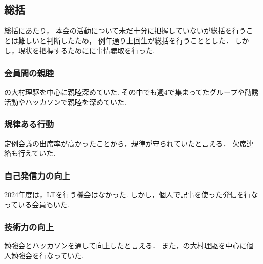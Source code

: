 \subsection*{\firstGrade{}総括}



\firstGrade{}総括にあたり，
本会の活動について未だ十分に把握していない\firstGrade{}が総括を行うことは難しいと判断したため，
例年通り上回生が総括を行うこととした．
しかし，現状を把握するために\firstGrade{}に事情聴取を行った.

\subsubsection*{会員間の親睦}
\firstGrade{}の大村理駆を中心に親睦深めていた.
その中でも週4で集まってたグループや勧誘活動やハッカソンで親睦を深めていた.


\subsubsection*{規律ある行動}
定例会議の出席率が高かったことから，規律が守られていたと言える．
欠席連絡も行えていた.

\subsubsection*{自己発信力の向上}
2024年度は，LTを行う機会はなかった.
しかし，個人で記事を使った発信を行なっている会員もいた.

\subsubsection*{技術力の向上}
勉強会とハッカソンを通して向上したと言える．
また，\firstGrade{}の大村理駆を中心に個人勉強会を行なっていた.